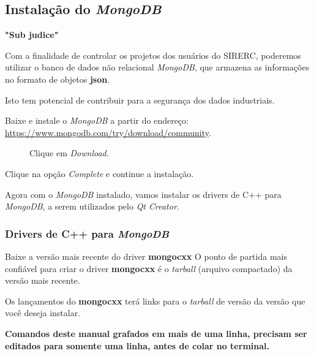 \documentclass[a4paper,11pt]{article}
\newcommand{\sistema}{\textsf{SIRERC}}
\newcommand{\qtcreator}{\textit{Qt Creator}}
\newcommand{\download}{\textit{Download}}
\newcommand{\mongo}{\textit{MongoDB}}
\newcommand{\cautionbox}[1]{
	\vskip 5mm
	\begin{leftbar}
		\textbf{#1}
	\end{leftbar}
	\vskip 5mm
}
\begin{document}
\subsection{Instalação do \mongo{}}

\cautionbox{\color{red}"Sub judice"}

\color{brown}

Com a finalidade de controlar os projetos dos usuários do \sistema{}, poderemos utilizar o banco de dados não relacional \mongo{}, que armazena as informações no formato de objetos \textbf{json}.

Isto tem potencial de contribuir para a segurança dos dados industriais.

Baixe e instale o \mongo{} a partir do endereço: \url{https://www.mongodb.com/try/download/community}.

\begin{figure}[H]
	\centering
	\caption{Clique em \download{}.}\label{fig:mongodb_download_2}
\end{figure}

Clique na opção \textit{Complete} e continue a instalação.

Agora com o \mongo{} instalado, vamos instalar os drivers de C++ para \mongo{}, a serem utilizados pelo \qtcreator{}.


\subsubsection{Drivers de C++ para \mongo{}}

Baixe a versão mais recente do driver \textbf{mongocxx}
O ponto de partida mais confiável para criar o driver \textbf{mongocxx} é o \textit{tarball} (arquivo compactado) da versão mais recente.

Os lançamentos do \textbf{mongocxx} terá links para o \textit{tarball} de versão da versão que você deseja instalar.

\cautionbox{\color{orange}Comandos deste manual grafados em mais de uma linha, precisam ser editados para somente uma linha, antes de colar no terminal.}
\end{document}
